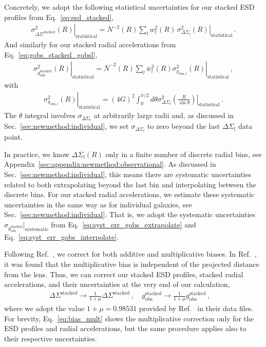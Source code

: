 \documentclass[a4paper,11pt]{article}
\begin{document}
Concretely, we adopt the following statistical uncertainties for our stacked ESD profiles from Eq.~\eqref{eq:esd_stacked},
\begin{align}
 \left. \sigma_{\Delta \Sigma^{\mathrm{stacked}}}^2(R)\right|_{\mathrm{statistical}} = N^{-2}(R) \sum_l w_l^2(R) \, \left. \sigma^2_{\Delta \Sigma_l}(R)\right|_{\mathrm{statistical}}\,.
\end{align}
And similarly for our stacked radial accelerations from Eq.~\eqref{eq:gobs_stacked_gobsl},
\begin{align}
 \label{eq:gobs_stacked_err_stat}
 \left. \sigma_{g^{\mathrm{stacked}}_{\mathrm{obs}}}^2(R)\right|_{\mathrm{statistical}} = \bar{N}^{-2}(R) \sum_l \bar{w}_l^2(R) \left. \sigma_{g_{\mathrm{obs},l}}^2(R)\right|_{\mathrm{statistical}} \,,
\end{align}
with
\begin{align}
 \label{eq:gobsl_stacked_err_stat}
 \left. \sigma_{g_{\mathrm{obs},l}}^2(R)\right|_{\mathrm{statistical}} =  (4G)^2 \int_0^{\pi/2} d\theta \left. \sigma^2_{\Delta \Sigma_l}\left(\frac{R}{\sin \theta}\right)\right|_{\mathrm{statistical}}\,.
\end{align}
The $\theta$ integral involves $\sigma_{\mathrm{\Delta \Sigma_l}}$ at arbitrarily large radii and, as discussed in Sec.~\ref{sec:newmethod:individual}, we set $\sigma_{\Delta \Sigma_l}$ to zero beyond the last $\Delta \Sigma_l$ data point.

In practice, we know $\Delta \Sigma_l(R)$ only in a finite number of discrete radial bins, see Appendix~\ref{sec:appendix:newmethod:observational}.
As discussed in Sec.~\ref{sec:newmethod:individual}, this means there are systematic uncertainties related to both extrapolating beyond the last bin and interpolating between the discrete bins.
For our stacked radial accelerations, we estimate these systematic uncertainties in the same way as for individual galaxies, see Sec.~\ref{sec:newmethod:individual}.
That is, we adopt the systematic uncertainties $\sigma_{g_{\mathrm{obs}}^{\mathrm{stacked}}}|_{\mathrm{systematic}}$ from Eq.~\eqref{eq:syst_err_gobs_extrapolate} and Eq.~\eqref{eq:syst_err_gobs_interpolate}.

Following Ref.~\cite{Brouwer2021}, we correct for both additive and multiplicative biases.
In Ref.~\cite{Brouwer2021}, it was found that the multiplicative bias is independent of the projected distance from the lens.
Thus, we can correct our stacked ESD profiles, stacked radial accelerations, and their uncertainties at the very end of our calculation,
\begin{align}
 \label{eq:bias_mult}
 \Delta \Sigma^{\mathrm{stacked}} \to \frac{1}{1+ \mu} \Delta \Sigma^{\mathrm{stacked}} \,, \quad
 g_{\mathrm{obs}}^{\mathrm{stacked}} \to \frac{1}{1+ \mu}g_{\mathrm{obs}}^{\mathrm{stacked}} \,, \quad
\end{align}
where we adopt the value $1+\mu = 0.98531$ provided by Ref.~\cite{Brouwer2021} in their data files.
For brevity, Eq.~\eqref{eq:bias_mult} shows the multiplicative correction only for the ESD profiles and radial accelerations, but the same procedure applies also to their respective uncertainties.
\end{document}
